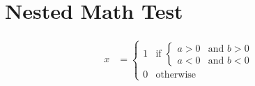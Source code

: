 \documentclass{article}
\begin{document}
\section{Nested Math Test}
\begin{align}
x &= \begin{cases}
1 & \text{if } \begin{cases}
a > 0 & \text{and } b > 0 \\
a < 0 & \text{and } b < 0
\end{cases} \\
0 & \text{otherwise}
\end{cases}
\end{align}
\end{document}
